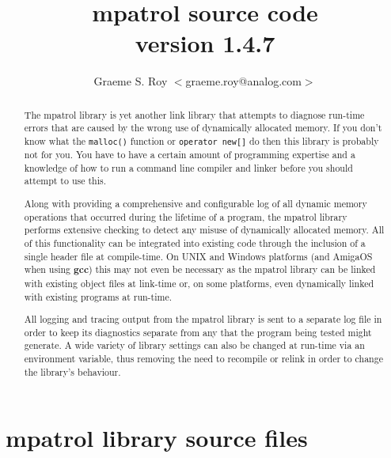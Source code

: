 \documentclass[a4paper,final]{report}
\newcommand{\version}[0]{1.4.7}
\begin{document}
\title{\textbf{mpatrol source code} \\ version \version}

\author{Graeme S. Roy $<$graeme.roy@analog.com$>$}

\maketitle

\begin{abstract}
The mpatrol library is yet another link library that attempts to diagnose
run-time errors that are caused by the wrong use of dynamically allocated
memory.  If you don't know what the \texttt{malloc()} function or
\texttt{operator new[]} do then this library is probably not for you.  You
have to have a certain amount of programming expertise and a knowledge of
how to run a command line compiler and linker before you should attempt to
use this.

Along with providing a comprehensive and configurable log of all dynamic
memory operations that occurred during the lifetime of a program, the
mpatrol library performs extensive checking to detect any misuse of
dynamically allocated memory.  All of this functionality can be integrated
into existing code through the inclusion of a single header file at
compile-time.  On UNIX and Windows platforms (and AmigaOS when using
\textbf{gcc}) this may not even be necessary as the mpatrol library can be
linked with existing object files at link-time or, on some platforms, even
dynamically linked with existing programs at run-time.

All logging and tracing output from the mpatrol library is sent to a
separate log file in order to keep its diagnostics separate from any that
the program being tested might generate.  A wide variety of library settings
can also be changed at run-time via an environment variable, thus removing
the need to recompile or relink in order to change the library's behaviour.
\end{abstract}


\tableofcontents

\chapter{mpatrol library source files}


\pagestyle{myheadings}
\end{document}
